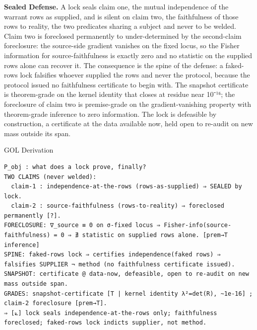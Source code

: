 \documentclass[10pt,twocolumn]{article}
\begin{document}
\textbf{Sealed Defense.} A lock seals claim one, the mutual independence
of the warrant rows as supplied, and is silent on claim two, the
faithfulness of those rows to reality, the two predicates sharing a
subject and never to be welded. Claim two is foreclosed permanently to
under-determined by the second-claim foreclosure: the source-side
gradient vanishes on the fixed locus, so the Fisher information for
source-faithfulness is exactly zero and no statistic on the supplied
rows alone can recover it. The consequence is the spine of the defense:
a faked-rows lock falsifies whoever supplied the rows and never the
protocol, because the protocol issued no faithfulness certificate to
begin with. The snapshot certificate is theorem-grade on the kernel
identity that closes at residue near 10⁻¹⁶; the foreclosure of claim two
is premise-grade on the gradient-vanishing property with theorem-grade
inference to zero information. The lock is defeasible by construction, a
certificate at the data available now, held open to re-audit on new mass
outside its span.

\begin{golbox}{GOL Derivation}
\begin{lstlisting}[style=golv]
P_obj : what does a lock prove, finally?
TWO CLAIMS (never welded):
  claim-1 : independence-at-the-rows (rows-as-supplied) ⇒ SEALED by lock.
  claim-2 : source-faithfulness (rows-to-reality) ⇒ foreclosed permanently [?].
FORECLOSURE: ∇_source ≡ 0 on σ-fixed locus ⇒ Fisher-info(source-faithfulness) = 0 ⇒ ∄ statistic on supplied rows alone. [prem→T inference]
SPINE: faked-rows lock ⇒ certifies independence(faked rows) ⇒ falsifies SUPPLIER ¬ method (no faithfulness certificate issued).
SNAPSHOT: certificate @ data-now, defeasible, open to re-audit on new mass outside span.
GRADES: snapshot-certificate [T | kernel identity λ²=det(R), ~1e-16] ; claim-2 foreclosure [prem→T].
⇒ [⟀] lock seals independence-at-the-rows only; faithfulness foreclosed; faked-rows lock indicts supplier, not method.
\end{lstlisting}
\end{golbox}
\end{document}
